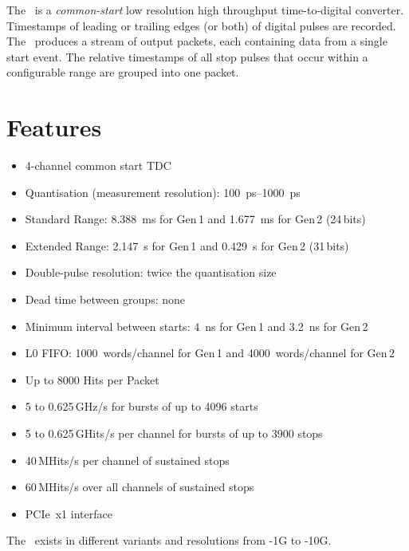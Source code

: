 The \deviceName\ is a \emph{common-start} low resolution high throughput
time-to-digital converter.  Timestamps of leading or trailing edges (or both)
of digital pulses are recorded.  The \deviceName\ produces a stream of output
packets, each containing data from a single start event.  The relative
timestamps of all stop pulses that occur within a configurable range are
grouped into one packet.

\section{Features} \label{sec:features}
\begin{itemize}
    \item 4-channel common start TDC
    \item Quantisation (measurement resolution):
        \SIrange{100}{1000}{\pico\second}
    \item Standard Range: \SI{8.388}{\milli\second} for Gen\,1 and
        \SI{1.677}{\milli\second} for Gen\,2 (24\,bits)
    \item Extended Range: \SI{2.147}{\second} for Gen\,1 and
        \SI{0.429}{\second} for Gen\,2 (31\,bits)
    \item Double-pulse resolution: twice the quantisation size
    \item Dead time between groups: none
    \item Minimum interval between starts: \SI{4}{\nano\second} for Gen\,1
        and \SI{3.2}{\nano\second} for Gen\,2
    \item L0 FIFO: 1000~words/channel for Gen\,1 and 4000~words/channel for
        Gen\,2
    \item Up to 8000 Hits per Packet
    \item 5 to 0.625\,GHz/s for bursts of up to 4096 starts
    \item 5 to 0.625\,GHits/s per channel for bursts of up to 3900 stops
    \item 40\,MHits/s per channel of sustained stops
    \item 60\,MHits/s over all channels of sustained stops
    \item PCIe~x1 interface
\end{itemize} 

The \deviceName\ exists in different variants and resolutions from
\deviceName-1G to \deviceName-10G.  

